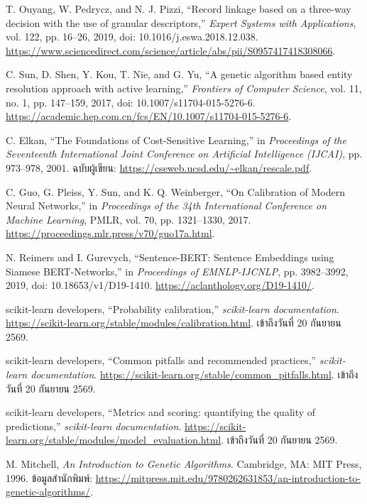 \documentclass[12pt,a4paper]{report}
\begin{document}
\noindent [10] T. Ouyang, W. Pedrycz, and N. J. Pizzi, ``Record linkage based on a three-way decision with the use of granular descriptors,'' \textit{Expert Systems with Applications}, vol. 122, pp. 16--26, 2019, doi: 10.1016/j.eswa.2018.12.038. \url{https://www.sciencedirect.com/science/article/abs/pii/S0957417418308066}.

\noindent [11] C. Sun, D. Shen, Y. Kou, T. Nie, and G. Yu, ``A genetic algorithm based entity resolution approach with active learning,'' \textit{Frontiers of Computer Science}, vol. 11, no. 1, pp. 147--159, 2017, doi: 10.1007/s11704-015-5276-6. \url{https://academic.hep.com.cn/fcs/EN/10.1007/s11704-015-5276-6}.

\noindent [12] C. Elkan, ``The Foundations of Cost-Sensitive Learning,'' in \textit{Proceedings of the Seventeenth International Joint Conference on Artificial Intelligence (IJCAI)}, pp. 973--978, 2001. ฉบับผู้เขียน: \url{https://cseweb.ucsd.edu/~elkan/rescale.pdf}.

\noindent [13] C. Guo, G. Pleiss, Y. Sun, and K. Q. Weinberger, ``On Calibration of Modern Neural Networks,'' in \textit{Proceedings of the 34th International Conference on Machine Learning}, PMLR, vol. 70, pp. 1321--1330, 2017. \url{https://proceedings.mlr.press/v70/guo17a.html}.

\noindent [14] N. Reimers and I. Gurevych, ``Sentence-BERT: Sentence Embeddings using Siamese BERT-Networks,'' in \textit{Proceedings of EMNLP-IJCNLP}, pp. 3982--3992, 2019, doi: 10.18653/v1/D19-1410. \url{https://aclanthology.org/D19-1410/}.

\noindent [15] scikit-learn developers, ``Probability calibration,'' \textit{scikit-learn documentation}. \url{https://scikit-learn.org/stable/modules/calibration.html}. เข้าถึงวันที่ 20 กันยายน 2569.

\noindent [16] scikit-learn developers, ``Common pitfalls and recommended practices,'' \textit{scikit-learn documentation}. \url{https://scikit-learn.org/stable/common_pitfalls.html}. เข้าถึงวันที่ 20 กันยายน 2569.

\noindent [17] scikit-learn developers, ``Metrics and scoring: quantifying the quality of predictions,'' \textit{scikit-learn documentation}. \url{https://scikit-learn.org/stable/modules/model_evaluation.html}. เข้าถึงวันที่ 20 กันยายน 2569.

\noindent [18] M. Mitchell, \textit{An Introduction to Genetic Algorithms}. Cambridge, MA: MIT Press, 1996. ข้อมูลสำนักพิมพ์: \url{https://mitpress.mit.edu/9780262631853/an-introduction-to-genetic-algorithms/}.
\end{document}
